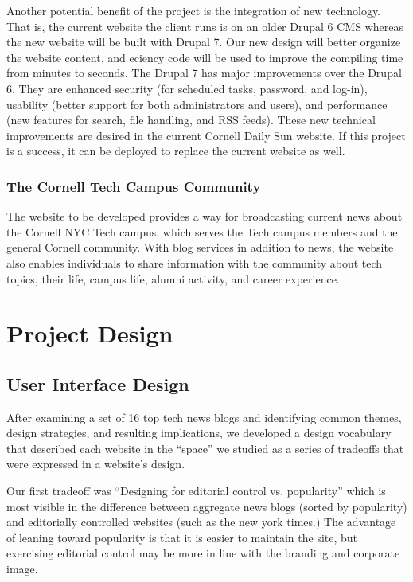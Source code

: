 \documentclass[10pt]{article} %
\begin{document}
Another potential benefit of the project is the integration of new technology. That is, the current website the client runs is on an older Drupal 6 CMS whereas the new website will be built with Drupal 7. Our new design will better organize the website content, and eciency code will be used to improve the compiling time from minutes to seconds. The Drupal 7 has major improvements over the Drupal 6. They are enhanced security (for scheduled tasks, password, and log-in), usability (better support for both administrators and users), and performance (new features for search, file handling, and RSS feeds). These new technical improvements are desired in the current Cornell Daily Sun website. If this project is a success, it can be deployed to replace the current website as well.
                   
\subsubsection{The Cornell Tech Campus Community}
                   
The website to be developed provides a way for broadcasting current news about the Cornell NYC Tech campus, which serves the Tech campus members and the general Cornell community. With blog services in addition to news, the website also enables individuals to share information with the community about tech topics, their life, campus life, alumni activity, and career experience. 

\section{Project Design}

\subsection{User Interface Design}

After examining a set of 16 top tech news blogs and identifying common themes, design strategies, and resulting implications, we developed a design vocabulary that described each website in the “space” we studied as a series of tradeoffs that were expressed in a website’s design.
                
Our first tradeoff was “Designing for editorial control vs. popularity” which is most visible in the difference between aggregate news blogs (sorted by popularity) and editorially controlled websites (such as the new york times.) The advantage of leaning toward popularity is that it is easier to maintain the site, but exercising editorial control may be more in line with the branding and corporate image.
                
\end{document}
